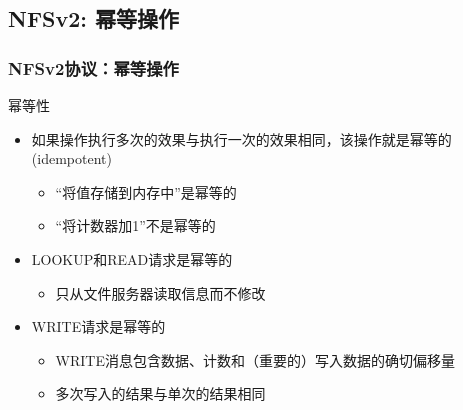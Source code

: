     \subsection{NFSv2: 幂等操作}
\begin{frame}[fragile]
    \frametitle{NFSv2协议：幂等操作}
    幂等性

        \begin{itemize}
            \item 如果操作执行多次的效果与执行一次的效果相同，该操作就是幂等的(idempotent)  \pause
            \begin{itemize}
                \item “将值存储到内存中”是幂等的
                \item “将计数器加1”不是幂等的
            \end{itemize} \pause
            \item LOOKUP和READ请求是幂等的
            \begin{itemize}
                \item 只从文件服务器读取信息而不修改
            \end{itemize}
            \item WRITE请求是幂等的
            \begin{itemize}
                \item WRITE消息包含数据、计数和（重要的）写入数据的确切偏移量
                \item 多次写入的结果与单次的结果相同
            \end{itemize}
        \end{itemize}
    
    
\end{frame}

